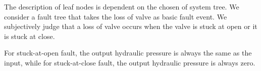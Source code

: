 The description of leaf nodes is dependent on the chosen of system tree.
We consider a fault tree that takes the loss of valve as basic fault event.
We subjectively judge that a loss of valve occurs when the valve is stuck at open or it is stuck at close. 

For stuck-at-open fault, the output hydraulic pressure is always the same as the input, while for stuck-at-close fault, the output hydraulic pressure is always zero.

